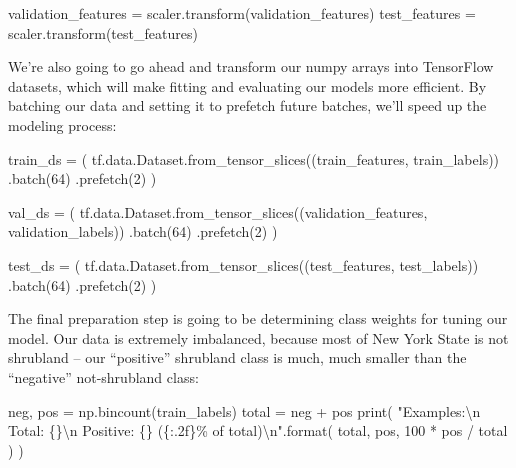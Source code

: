 \documentclass[
  letterpaper,
  DIV=11,
  numbers=noendperiod]{scrartcl}
\newenvironment{Shaded}{\begin{snugshade}}{\end{snugshade}}
\newcommand{\BuiltInTok}[1]{\textcolor[rgb]{0.00,0.23,0.31}{#1}}
\newcommand{\CharTok}[1]{\textcolor[rgb]{0.13,0.47,0.30}{#1}}
\newcommand{\DecValTok}[1]{\textcolor[rgb]{0.68,0.00,0.00}{#1}}
\newcommand{\NormalTok}[1]{\textcolor[rgb]{0.00,0.23,0.31}{#1}}
\newcommand{\OperatorTok}[1]{\textcolor[rgb]{0.37,0.37,0.37}{#1}}
\newcommand{\SpecialCharTok}[1]{\textcolor[rgb]{0.37,0.37,0.37}{#1}}
\newcommand{\StringTok}[1]{\textcolor[rgb]{0.13,0.47,0.30}{#1}}
\begin{document}
\begin{Shaded}
\begin{Highlighting}[]
\NormalTok{validation\_features }\OperatorTok{=}\NormalTok{ scaler.transform(validation\_features)}
\NormalTok{test\_features }\OperatorTok{=}\NormalTok{ scaler.transform(test\_features)}
\end{Highlighting}
\end{Shaded}

We're also going to go ahead and transform our numpy arrays into
TensorFlow datasets, which will make fitting and evaluating our models
more efficient. By batching our data and setting it to prefetch future
batches, we'll speed up the modeling process:

\begin{Shaded}
\begin{Highlighting}[]
\NormalTok{train\_ds }\OperatorTok{=}\NormalTok{ (}
\NormalTok{    tf.data.Dataset.from\_tensor\_slices((train\_features, train\_labels))}
\NormalTok{    .batch(}\DecValTok{64}\NormalTok{)}
\NormalTok{    .prefetch(}\DecValTok{2}\NormalTok{)}
\NormalTok{)}

\NormalTok{val\_ds }\OperatorTok{=}\NormalTok{ (}
\NormalTok{    tf.data.Dataset.from\_tensor\_slices((validation\_features, validation\_labels))}
\NormalTok{    .batch(}\DecValTok{64}\NormalTok{)}
\NormalTok{    .prefetch(}\DecValTok{2}\NormalTok{)}
\NormalTok{)}

\NormalTok{test\_ds }\OperatorTok{=}\NormalTok{ (}
\NormalTok{    tf.data.Dataset.from\_tensor\_slices((test\_features, test\_labels))}
\NormalTok{    .batch(}\DecValTok{64}\NormalTok{)}
\NormalTok{    .prefetch(}\DecValTok{2}\NormalTok{)}
\NormalTok{)}
\end{Highlighting}
\end{Shaded}

The final preparation step is going to be determining class weights for
tuning our model. Our data is extremely imbalanced, because most of New
York State is not shrubland -- our ``positive'' shrubland class is much,
much smaller than the ``negative'' not-shrubland class:

\begin{Shaded}
\begin{Highlighting}[]
\NormalTok{neg, pos }\OperatorTok{=}\NormalTok{ np.bincount(train\_labels)}
\NormalTok{total }\OperatorTok{=}\NormalTok{ neg }\OperatorTok{+}\NormalTok{ pos}
\BuiltInTok{print}\NormalTok{(}
    \StringTok{"Examples:}\CharTok{\textbackslash{}n}\StringTok{    Total: }\SpecialCharTok{\{\}}\CharTok{\textbackslash{}n}\StringTok{    Positive: }\SpecialCharTok{\{\}}\StringTok{ (}\SpecialCharTok{\{:.2f\}\% o}\StringTok{f total)}\CharTok{\textbackslash{}n}\StringTok{"}\NormalTok{.}\BuiltInTok{format}\NormalTok{(}
\NormalTok{        total, pos, }\DecValTok{100} \OperatorTok{*}\NormalTok{ pos }\OperatorTok{/}\NormalTok{ total}
\NormalTok{    )}
\NormalTok{)}
\end{Highlighting}
\end{Shaded}
\end{document}
